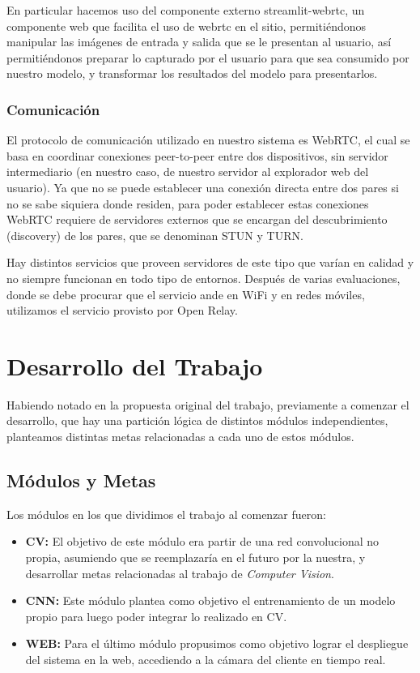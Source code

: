 \documentclass[a4paper]{article}
\begin{document}
En particular hacemos uso del componente externo streamlit-webrtc, un componente web que facilita el uso de webrtc en el sitio, permitiéndonos manipular las imágenes de entrada y salida que se le presentan al usuario, así permitiéndonos preparar lo capturado por el usuario para que sea consumido por nuestro modelo, y transformar los resultados del modelo para presentarlos.

\subsubsection{Comunicación}

El protocolo de comunicación utilizado en nuestro sistema es WebRTC, el cual se basa en coordinar conexiones peer-to-peer entre dos dispositivos, sin servidor intermediario (en nuestro caso, de nuestro servidor al explorador web del usuario). Ya que no se puede establecer una conexión directa entre dos pares si no se sabe siquiera donde residen, para poder establecer estas conexiones WebRTC requiere de servidores externos que se encargan del descubrimiento (discovery) de los pares, que se denominan STUN y TURN.

Hay distintos servicios que proveen servidores de este tipo que varían en calidad y no siempre funcionan en todo tipo de entornos. Después de varias evaluaciones, donde se debe procurar que el servicio ande en WiFi y en redes móviles, utilizamos el servicio provisto por Open Relay.

\section{Desarrollo del Trabajo}

Habiendo notado en la propuesta original del trabajo, previamente a comenzar el desarrollo, que hay una partición lógica de distintos módulos independientes, planteamos distintas metas relacionadas a cada uno de estos módulos.

\subsection{Módulos y Metas}

Los módulos en los que dividimos el trabajo al comenzar fueron:

\begin{itemize}
    \item \textbf{CV:} El objetivo de este módulo era partir de una red convolucional no propia, asumiendo que se reemplazaría en el futuro por la nuestra, y desarrollar metas relacionadas al trabajo de \textit{Computer Vision}.

    \item \textbf{CNN:} Este módulo plantea como objetivo el entrenamiento de un modelo propio  para luego poder integrar lo realizado en CV.

    \item \textbf{WEB:} Para el último módulo propusimos como objetivo lograr el despliegue del sistema en la web, accediendo a la cámara del cliente en tiempo real.
\end{itemize}
\end{document}
